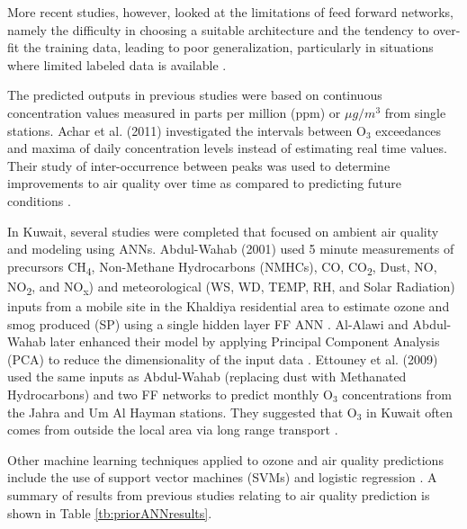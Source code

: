 \documentclass[preprint,12pt,authoryear]{elsarticle}
\begin{document}
\begin{linenumbers}
More recent studies, however, looked at the limitations of feed forward networks, namely the difficulty in choosing a suitable architecture and the tendency to over-fit the training data, leading to poor generalization, particularly in situations where limited labeled data is available \citep{Lu2005, Papaleonidas2013}.  

The predicted outputs in previous studies \citep{Arhami2013} were based on continuous concentration values measured in parts per million (ppm) or $\mu g/m^{3}$ from single stations. Achar et al. (2011) investigated the intervals between O$_{3}$ exceedances and maxima of daily concentration levels instead of estimating real time values. Their study of inter-occurrence between peaks was used to determine improvements to air quality over time as compared to predicting future conditions \citep{Achcar2011}. 

In Kuwait, several studies were completed that focused on ambient air quality and modeling using ANNs. Abdul-Wahab (2001) used 5 minute measurements of precursors CH\textsubscript{4}, Non-Methane Hydrocarbons (NMHCs), CO, CO\textsubscript{2}, Dust, NO, NO\textsubscript{2}, and NO\textsubscript{x}) and meteorological (WS, WD, TEMP, RH, and Solar Radiation) inputs from a mobile site in the Khaldiya residential area to estimate ozone and smog produced (SP)  using a single hidden layer FF ANN \citep{Abdul-Wahab2001}. Al-Alawi and Abdul-Wahab later enhanced their model by applying Principal Component Analysis (PCA) to reduce the dimensionality of the input data \citep{Al-Alawi2008}.  Ettouney et al. (2009) used the same inputs as Abdul-Wahab (replacing dust with Methanated Hydrocarbons) and two FF networks to predict monthly O$_{3}$ concentrations from the Jahra and Um Al Hayman stations. They suggested that O$_{3}$ in Kuwait often comes from outside the local area via long range transport \citep{Ettouney2009a}. 

Other machine learning techniques applied to ozone and air quality predictions include the use of support vector machines (SVMs) \citep{Luna2014, Papaleonidas2013, Singh2013} and logistic regression \citep{Zickus2002}. A summary of results from previous studies relating to air quality prediction is shown in Table \ref{tb:priorANNresults}.\\

\end{linenumbers}
	
\end{document}
